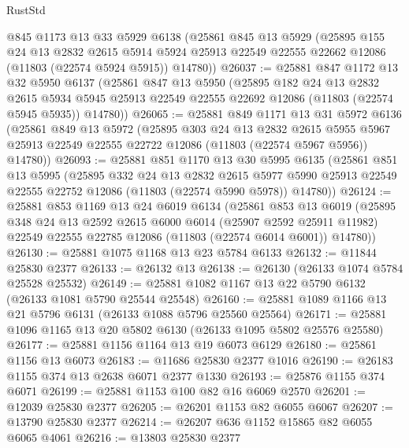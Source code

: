 \begin{lexlean}{RustStd}
\begin{coremodule}
    @845
    @1173
    @13
    @33
    @5929
    @6138
    (@25861
      @845
      @13
      @5929
      (@25895
        @155
        @24
        @13
        @2832
        @2615
        @5914
        @5924
        @25913
        @22549
        @22555
        @22662
        @12086
        (@11803 (@22574 @5924 @5915))
        @14780))
@26037 := @25881
    @847
    @1172
    @13
    @32
    @5950
    @6137
    (@25861
      @847
      @13
      @5950
      (@25895
        @182
        @24
        @13
        @2832
        @2615
        @5934
        @5945
        @25913
        @22549
        @22555
        @22692
        @12086
        (@11803 (@22574 @5945 @5935))
        @14780))
@26065 := @25881
    @849
    @1171
    @13
    @31
    @5972
    @6136
    (@25861
      @849
      @13
      @5972
      (@25895
        @303
        @24
        @13
        @2832
        @2615
        @5955
        @5967
        @25913
        @22549
        @22555
        @22722
        @12086
        (@11803 (@22574 @5967 @5956))
        @14780))
@26093 := @25881
    @851
    @1170
    @13
    @30
    @5995
    @6135
    (@25861
      @851
      @13
      @5995
      (@25895
        @332
        @24
        @13
        @2832
        @2615
        @5977
        @5990
        @25913
        @22549
        @22555
        @22752
        @12086
        (@11803 (@22574 @5990 @5978))
        @14780))
@26124 := @25881
    @853
    @1169
    @13
    @24
    @6019
    @6134
    (@25861
      @853
      @13
      @6019
      (@25895
        @348
        @24
        @13
        @2592
        @2615
        @6000
        @6014
        (@25907 @2592 @25911 @11982)
        @22549
        @22555
        @22785
        @12086
        (@11803 (@22574 @6014 @6001))
        @14780))
@26130 := @25881 @1075 @1168 @13 @23 @5784 @6133
@26132 := @11844 @25830 @2377
@26133 := @26132 @13
@26138 := @26130 (@26133 @1074 @5784 @25528 @25532)
@26149 := @25881 @1082 @1167 @13 @22 @5790 @6132 (@26133 @1081 @5790 @25544 @25548)
@26160 := @25881 @1089 @1166 @13 @21 @5796 @6131 (@26133 @1088 @5796 @25560 @25564)
@26171 := @25881 @1096 @1165 @13 @20 @5802 @6130 (@26133 @1095 @5802 @25576 @25580)
@26177 := @25881 @1156 @1164 @13 @19 @6073 @6129
@26180 := @25861 @1156 @13 @6073
@26183 := @11686 @25830 @2377 @1016
@26190 := @26183 @1155 @374 @13 @2638 @6071 @2377 @1330
@26193 := @25876 @1155 @374 @6071
@26199 := @25881 @1153 @100 @82 @16 @6069 @2570
@26201 := @12039 @25830 @2377
@26205 := @26201 @1153 @82 @6055 @6067
@26207 := @13790 @25830 @2377
@26214 := @26207 @636 @1152 @15865 @82 @6055 @6065 @4061
@26216 := @13803 @25830 @2377

\end{coremodule}
\end{lexlean}
